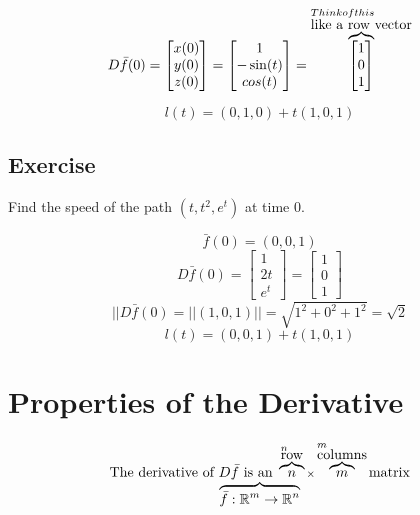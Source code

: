 \documentclass{article}
\begin{document}
\[D\bar{f}(0)=\begin{bmatrix}
    x(0)\\
    y(0)\\
    z(0)
\end{bmatrix}=\begin{bmatrix}
    1\\
    -\sin(t)\\
    cos(t)
\end{bmatrix}=\overbrace{\begin{bmatrix}
    1\\
    0\\
    1
\end{bmatrix}}^{\begin{subarray}
    \mbox{Think of this}\\
    \mbox{like a row vector}
\end{subarray}}\]

\[l(t)=(0,1,0)+t(1,0,1)\]

\subsection*{Exercise}
Find the speed of the path $(t,t^2,e^t)$ at time 0.

\[\bar{f}(0)=(0,0,1)\]
\[D\bar{f}(0)=\begin{bmatrix}
    1\\
    2t\\
    e^t
\end{bmatrix}=\begin{bmatrix}
    1\\
    0\\
    1
\end{bmatrix}\]
\[||D\bar{f}(0)=||(1,0,1)||=\sqrt{1^2+0^2+1^2}=\sqrt{2}\]
\[l(t)=(0,0,1)+t(1,0,1)\]

\section{Properties of the Derivative}
\[\overbrace{\bar{f}:\mathbb{R}^m\rightarrow\mathbb{R}^n}^{\mbox{The derivative of $D\bar{f}$ is an }\overbrace{n}^{\begin{subarray}
    \mbox{n}\\
    \mbox{row}
\end{subarray}}\times\overbrace{m}^{\begin{subarray}
    \mbox{m}\\
    \mbox{columns}
\end{subarray}}\mbox{matrix}} \]
\end{document}
